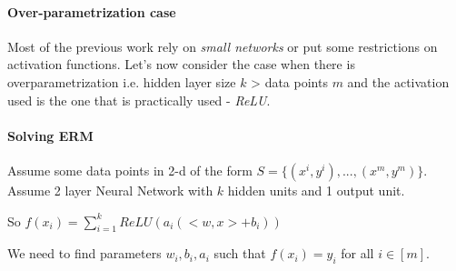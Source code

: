 \paragraph{Over-parametrization case} Most of the previous work rely on \textit{small networks} or put some restrictions on activation functions. Let's now consider the case when there is overparametrization i.e. hidden layer size $k$ > data points $m$ and the activation used is the one that is practically used - \textit{ReLU}.

\paragraph{Solving ERM}
Assume some data points in 2-d of the form $S = \{(x^i,y^i), ... , (x^m,y^m)\}$. Assume 2 layer Neural Network with $k$ hidden units and 1 output unit.

So $f(x_i) = \sum_{i=1}^{k}ReLU(a_i(<w,x> + b_i))$

We need to find parameters $w_i, b_i, a_i$ such that $f(x_i) = y_i$ for all $i \in [m]$.



